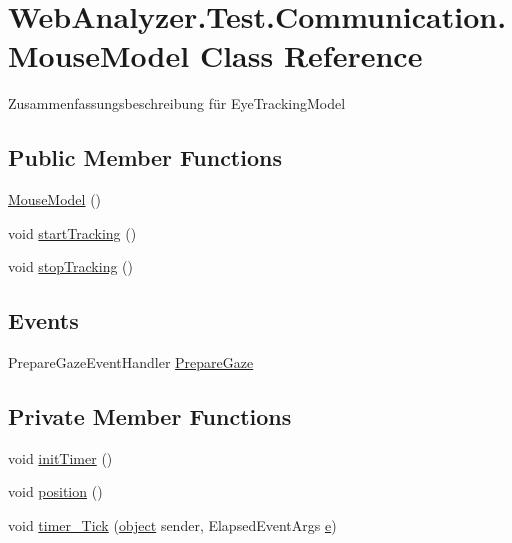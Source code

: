 \hypertarget{class_web_analyzer_1_1_test_1_1_communication_1_1_mouse_model}{}\section{Web\+Analyzer.\+Test.\+Communication.\+Mouse\+Model Class Reference}
\label{class_web_analyzer_1_1_test_1_1_communication_1_1_mouse_model}


Zusammenfassungsbeschreibung für Eye\+Tracking\+Model  


\subsection*{Public Member Functions}
\begin{DoxyCompactItemize}
\item 
\hyperlink{class_web_analyzer_1_1_test_1_1_communication_1_1_mouse_model_ad84f4a65000f2e03f7003546d5e63dd2}{Mouse\+Model} ()
\item 
void \hyperlink{class_web_analyzer_1_1_test_1_1_communication_1_1_mouse_model_a6653ac676087ae6e96f00261cc7c61a9}{start\+Tracking} ()
\item 
void \hyperlink{class_web_analyzer_1_1_test_1_1_communication_1_1_mouse_model_ad60321c25b5ad81d8ccf389498318af2}{stop\+Tracking} ()
\end{DoxyCompactItemize}
\subsection*{Events}
\begin{DoxyCompactItemize}
\item 
Prepare\+Gaze\+Event\+Handler \hyperlink{class_web_analyzer_1_1_test_1_1_communication_1_1_mouse_model_ad799e6cf6032401ee7d8b1706d7c8a20}{Prepare\+Gaze}
\end{DoxyCompactItemize}
\subsection*{Private Member Functions}
\begin{DoxyCompactItemize}
\item 
void \hyperlink{class_web_analyzer_1_1_test_1_1_communication_1_1_mouse_model_ab5f8535f5bfb5970dcc3b9b21fb575ff}{init\+Timer} ()
\item 
void \hyperlink{class_web_analyzer_1_1_test_1_1_communication_1_1_mouse_model_aadaab09f2e3165efbef5ff872f914439}{position} ()
\item 
void \hyperlink{class_web_analyzer_1_1_test_1_1_communication_1_1_mouse_model_abc9a2acb278976c242b6210d701c4900}{timer\+\_\+\+Tick} (\hyperlink{_u_i_2_h_t_m_l_resources_2js_2lib_2underscore_8min_8js_aae18b7515bb2bc4137586506e7c0c903}{object} sender, Elapsed\+Event\+Args \hyperlink{_u_i_2_h_t_m_l_resources_2js_2lib_2bootstrap_8min_8js_ab5902775854a8b8440bcd25e0fe1c120}{e})
\end{DoxyCompactItemize}

